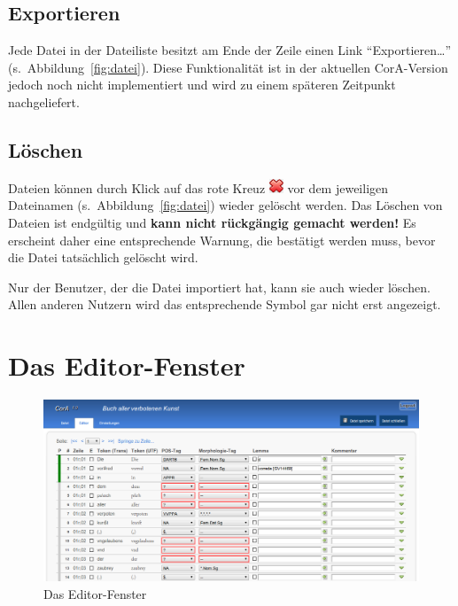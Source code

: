 \documentclass[11pt,a4paper,parskip=half]{scrartcl}
\begin{document}
\subsection{Exportieren}
\label{sec:datei-export}

Jede Datei in der Dateiliste besitzt am Ende der Zeile einen Link
"`Exportieren\ldots"' (s.\ Abbildung~\ref{fig:datei}).  Diese
Funktionalität ist in der aktuellen CorA-Version jedoch noch nicht
implementiert und wird zu einem späteren Zeitpunkt nachgeliefert.

\subsection{Löschen}
\label{sec:datei-delete}

Dateien können durch Klick auf das rote
Kreuz \includegraphics[height=0.8\baselineskip]{img/delete.png} vor
dem jeweiligen Dateinamen (s.\ Abbildung~\ref{fig:datei}) wieder gelöscht werden.  Das Löschen von
Dateien ist endgültig und \textbf{kann nicht rückgängig gemacht
  werden!}  Es erscheint daher eine entsprechende Warnung, die
bestätigt werden muss, bevor die Datei tatsächlich gelöscht wird.

Nur der Benutzer, der die Datei importiert hat, kann sie auch wieder
löschen.  Allen anderen Nutzern wird das entsprechende Symbol gar
nicht erst angezeigt.

\newpage
\section{Das Editor-Fenster}
\label{sec:editor}

\begin{figure}[!b]
  \centering
  \includegraphics[width=\linewidth]{img/editor.png}
  \caption{Das Editor-Fenster}
  \label{fig:editor}
\end{figure}
\end{document}
